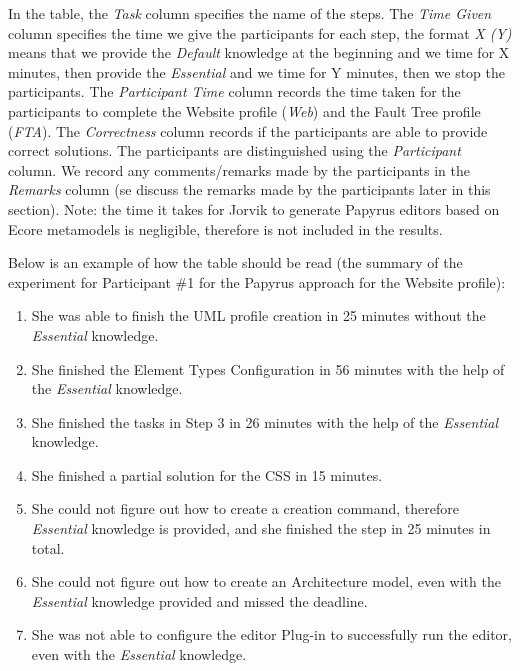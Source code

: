 In the table, the \textit{Task} column specifies the name of the steps. 
The \textit{Time Given} column specifies the time we give the participants for each step, the format \textit{X (Y)} means that we provide the \textit{Default} knowledge at the beginning and we time for X minutes, then provide the \textit{Essential} and we time for Y minutes, then we stop the participants.
The \textit{Participant Time} column records the time taken for the participants to complete the Website profile (\textit{Web}) and the Fault Tree profile (\textit{FTA}). 
The \textit{Correctness} column records if the participants are able to provide correct solutions. 
The participants are distinguished using the \textit{Participant} column.
We record any comments/remarks made by the participants in the \textit{Remarks} column (se discuss the remarks made by the participants later in this section).
Note: the time it takes for Jorvik to generate Papyrus editors based on Ecore metamodels is negligible, therefore is not included in the results.


Below is an example of how the table should be read (the summary of the experiment for Participant \#1 for the Papyrus approach for the Website profile):
\begin{enumerate}
	\item She was able to finish the UML profile creation in 25 minutes without the \textit{Essential} knowledge. 
	\item She finished the Element Types Configuration in 56 minutes with the help of the \textit{Essential} knowledge. 
	
	\item She finished the tasks in Step 3 in 26 minutes with the help of the \textit{Essential} knowledge.
	
	\item She finished a partial solution for the CSS in 15 minutes.
	\item She could not figure out how to create a creation command, therefore \textit{Essential} knowledge is provided, and she finished the step in 25 minutes in total.
	
	\item She could not figure out how to create an Architecture model, even with the \textit{Essential} knowledge provided and missed the deadline.
	\item She was not able to configure the editor Plug-in to successfully run the editor, even with the \textit{Essential} knowledge. 
	
\end{enumerate}

